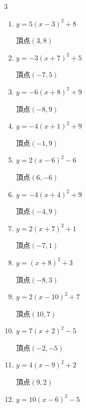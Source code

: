 \begin{multicols}{3}
\begin{enumerate}
        $\displaystyle 頂点\left( 9 , 4 \right)$

  \item $\displaystyle y=5\left( x-3\right)^{2}+8$

        $\displaystyle 頂点\left( 3 , 8 \right)$

  \item $\displaystyle y=-3\left( x+7\right)^{2}+5$

        $\displaystyle 頂点\left( -7 , 5 \right)$

  \item $\displaystyle y=-6\left( x+8\right)^{2}+9$

        $\displaystyle 頂点\left( -8 , 9 \right)$

  \item $\displaystyle y=-4\left( x+1\right)^{2}+9$

        $\displaystyle 頂点\left( -1 , 9 \right)$

  \item $\displaystyle y=2\left( x-6\right)^{2}-6$

        $\displaystyle 頂点\left( 6 , -6 \right)$

  \item $\displaystyle y=-4\left( x+4\right)^{2}+9$

        $\displaystyle 頂点\left( -4 , 9 \right)$

  \item $\displaystyle y=2\left( x+7\right)^{2}+1$

        $\displaystyle 頂点\left( -7 , 1 \right)$

  \item $\displaystyle y=\left( x+8\right)^{2}+3$

        $\displaystyle 頂点\left( -8 , 3 \right)$

  \item $\displaystyle y=2\left( x-10\right)^{2}+7$

        $\displaystyle 頂点\left( 10 , 7 \right)$

  \item $\displaystyle y=7\left( x+2\right)^{2}-5$

        $\displaystyle 頂点\left( -2 , -5 \right)$

  \item $\displaystyle y=4\left( x-9\right)^{2}+2$

        $\displaystyle 頂点\left( 9 , 2 \right)$

  \item $\displaystyle y=10\left( x-6\right)^{2}-5$


\end{enumerate}
\end{multicols}
